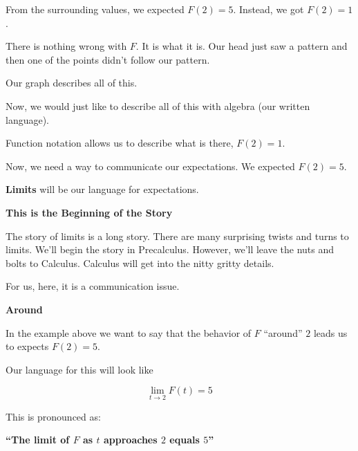 \documentclass{ximera}
\begin{document}
From the surrounding values, we expected $F(2) = 5$.  Instead, we got $F(2) = 1$. 


There is nothing wrong with $F$.  It is what it is.  Our head just saw a pattern and then one of the points didn't follow our pattern.

Our graph describes all of this.

Now, we would just like to describe all of this with algebra (our written language). 





Function notation allows us to describe what is there, $F(2) = 1$. 

Now, we need a way to communicate our expectations.  We expected $F(2) = 5$. 






\textbf{\textcolor{purple!85!blue}{Limits}} will be our language for expectations. 

\begin{warning} \textbf{\textcolor{red!70!black}{This is the Beginning of the Story}}

The story of limits is a long story.  There are many surprising twists and turns to limits. We'll begin the story in Precalculus.  However, we'll leave the nuts and bolts to Calculus. Calculus will get into the nitty gritty details. 

For us, here, it is a communication issue.

\end{warning}






\begin{idea} \textbf{\textcolor{blue!55!black}{Around}} 

In the example above we want to say that the behavior of $F$ ``around'' $2$ leads us to expects $F(2)=5$.

Our language for this will look like

\[   \lim\limits_{t \to 2} F(t) = 5\]


This is pronounced as: 


\begin{center}
\textbf{\textcolor{red!70!black}{``The limit of $F$ as $t$ approaches $2$ equals $5$''}}
\end{center}



\end{idea}
\end{document}
